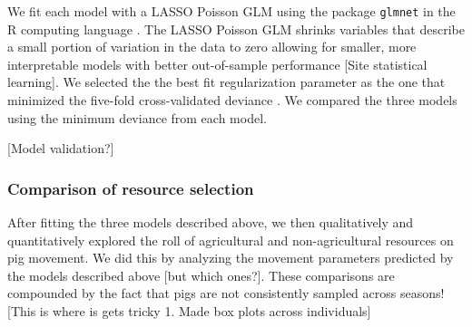 \documentclass[a4paper]{article}
\begin{document}
We fit each model with a LASSO Poisson GLM using the package \texttt{glmnet} in the R computing language \citep{Friedman2010}. The LASSO Poisson GLM shrinks variables that describe a small portion of variation in the data to zero allowing for smaller, more interpretable models with better out-of-sample performance [Site statistical learning].  We selected the the best fit regularization parameter as the one that minimized the five-fold cross-validated deviance \citep{Friedman2010}.  We compared the three models using the minimum deviance from each model.

[Model validation?]



\subsubsection*{Comparison of resource selection}

After fitting the three models described above, we then qualitatively and quantitatively explored the roll of agricultural and non-agricultural resources on pig movement.  We did this by analyzing the movement parameters predicted by the models described above [but which ones?]. These comparisons are compounded by the fact that pigs are not consistently sampled across seasons!   [This is where is gets tricky  1. Made box plots across individuals]


\end{document}
